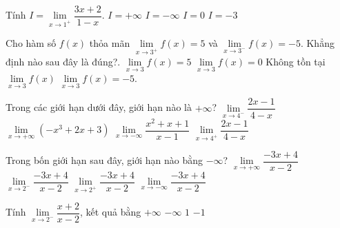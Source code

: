 \begin{ex}%
	Tính $I=\lim\limits_{x\to 1^+}\dfrac{3x+2}{1-x}$. 
	\choice 
		 {$I=+\infty$}
		{\True  $I=-\infty$}
		 {$I=0$}
		 {$I=-3$}
\end{ex}

\begin{ex}%
	Cho hàm số $f(x)$ thỏa mãn $\lim\limits_{x\to{3^{+}}}f(x)=5$ và $\lim\limits_{x\to{3^{-}}}f(x)=-5$. Khẳng định nào sau đây là đúng?. 
	\choice 
		{$\lim\limits_{x\to 3}f(x)=5$} 
		 {$\lim\limits_{x\to 3}f(x)=0$}
		{\True  Không tồn tại $\lim\limits_{x\to 3}f(x)$}
		{$\lim\limits_{x\to  3}f(x)=-5$.}
\end{ex}

\begin{ex}%
	Trong các giới hạn  dưới đây, giới hạn nào là $+\infty$?
	\choice 
		{\True  $\lim\limits_{x\to 4^{-}}\dfrac{2x-1}{4-x}$}
		{$\lim\limits_{x\to+\infty}\left(-x^3+2x+3\right)$} 
		 {$\lim\limits_{x\to-\infty}\dfrac{x^2+x+1}{x-1}$}
		 {$\lim\limits_{x\to 4^{+}}\dfrac{2 x-1}{4-x}$}
\end{ex}

\begin{ex}%
	Trong bốn giới hạn sau đây, giới hạn nào bằng $-\infty$? 
	\choice 
		 {$\lim\limits_{x\to+\infty}\dfrac{-3x+4}{x-2}$}
		{\True $\lim\limits_{x\to 2^{-}}\dfrac{-3x+4}{x-2}$} 
		{$\lim\limits_{x\to 2^{+}}\dfrac{-3x+4}{x-2}$} 
		{$\lim\limits_{x\to-\infty}\dfrac{-3x+4}{x-2}$} 
\end{ex}

\begin{ex}%
	Tính $\lim\limits_{x\to  2^-}\dfrac{x+2}{x-2}$, kết quả bằng
	\choice 
		{$+\infty$} 
		 {\True $-\infty$}
		 {$1$}
		{$-1$} 
\end{ex}

